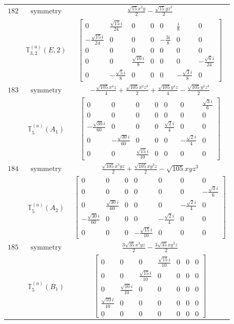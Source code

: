 \documentclass[fleqn,8pt,landscape]{jsarticle}
\begin{document}
\begin{longtable}{ccc}
$ 182 $ & $ \text{symmetry} $ & $ \frac{\sqrt{15} x^{2} y}{2} - \frac{\sqrt{15} y z^{2}}{2} $ \\
$  $ & $ \mathbb{T}_{3,2}^{(a)}(E,2) $ & $ \begin{bmatrix} 0 & \frac{\sqrt{15} i}{24} & 0 & 0 & 0 & \frac{i}{8} & 0 \\ - \frac{\sqrt{15} i}{24} & 0 & 0 & 0 & - \frac{3 i}{8} & 0 & 0 \\ 0 & 0 & 0 & 0 & 0 & 0 & 0 \\ 0 & 0 & \frac{\sqrt{10} i}{8} & 0 & 0 & 0 & - \frac{\sqrt{6} i}{24} \\ 0 & - \frac{\sqrt{5} i}{8} & 0 & 0 & 0 & - \frac{\sqrt{3} i}{8} & 0 \end{bmatrix} $ \\ \hline
$ 183 $ & $ \text{symmetry} $ & $ - \frac{\sqrt{105} x^{4} z}{4} + \frac{\sqrt{105} x^{2} z^{3}}{2} + \frac{\sqrt{105} y^{4} z}{4} - \frac{\sqrt{105} y^{2} z^{3}}{2} $ \\
$  $ & $ \mathbb{T}_{5}^{(a)}(A_{1}) $ & $ \begin{bmatrix} 0 & 0 & 0 & 0 & 0 & 0 & \frac{\sqrt{3} i}{6} \\ 0 & 0 & 0 & 0 & 0 & 0 & 0 \\ - \frac{\sqrt{30} i}{60} & 0 & 0 & 0 & \frac{\sqrt{2} i}{4} & 0 & 0 \\ 0 & - \frac{\sqrt{30} i}{60} & 0 & 0 & 0 & - \frac{\sqrt{2} i}{4} & 0 \\ 0 & 0 & \frac{\sqrt{15} i}{10} & 0 & 0 & 0 & 0 \end{bmatrix} $ \\ \hline
$ 184 $ & $ \text{symmetry} $ & $ \frac{\sqrt{105} x^{3} y z}{2} + \frac{\sqrt{105} x y^{3} z}{2} - \sqrt{105} x y z^{3} $ \\
$  $ & $ \mathbb{T}_{5}^{(a)}(A_{2}) $ & $ \begin{bmatrix} 0 & 0 & 0 & 0 & 0 & 0 & 0 \\ 0 & 0 & 0 & 0 & 0 & 0 & - \frac{\sqrt{3} i}{6} \\ 0 & \frac{\sqrt{30} i}{60} & 0 & 0 & 0 & - \frac{\sqrt{2} i}{4} & 0 \\ - \frac{\sqrt{30} i}{60} & 0 & 0 & 0 & - \frac{\sqrt{2} i}{4} & 0 & 0 \\ 0 & 0 & 0 & - \frac{\sqrt{15} i}{10} & 0 & 0 & 0 \end{bmatrix} $ \\ \hline
$ 185 $ & $ \text{symmetry} $ & $ \frac{3 \sqrt{35} x^{3} y z}{2} - \frac{3 \sqrt{35} x y^{3} z}{2} $ \\
$  $ & $ \mathbb{T}_{5}^{(a)}(B_{1}) $ & $ \begin{bmatrix} 0 & 0 & 0 & \frac{\sqrt{15} i}{10} & 0 & 0 & 0 \\ 0 & 0 & \frac{\sqrt{15} i}{10} & 0 & 0 & 0 & 0 \\ 0 & \frac{\sqrt{10} i}{10} & 0 & 0 & 0 & 0 & 0 \\ \frac{\sqrt{10} i}{10} & 0 & 0 & 0 & 0 & 0 & 0 \\ 0 & 0 & 0 & 0 & 0 & 0 & 0 \end{bmatrix} $ \\ \hline

\end{longtable}
\end{document}
